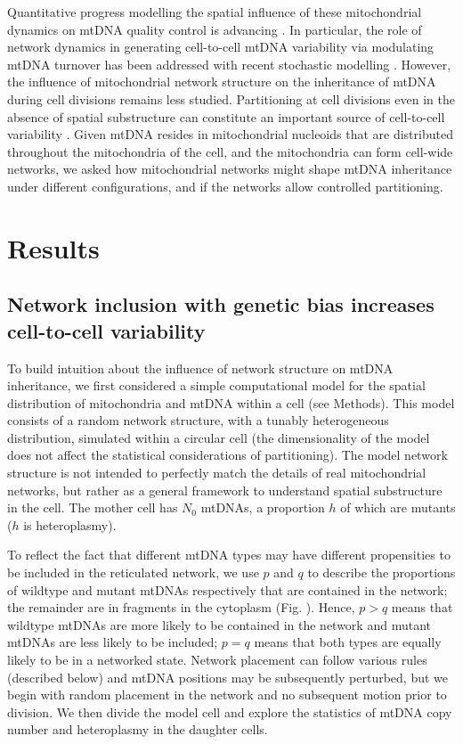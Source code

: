 \documentclass{article}
\begin{document}
Quantitative progress modelling the spatial influence of these mitochondrial dynamics on mtDNA quality control is advancing \citep{mouli2009frequency, tam2013mathematical, patel2013optimal, tam2015context,figge2012deceleration}. In particular, the role of network dynamics in generating cell-to-cell mtDNA variability via modulating mtDNA turnover has been addressed with recent stochastic modelling \cite{aryaman2019mitochondrial}. However, the influence of mitochondrial network structure on the inheritance of mtDNA during cell divisions remains less studied. Partitioning at cell divisions even in the absence of spatial substructure can constitute an important source of cell-to-cell variability \citep{huh2011non, johnston2015closed}. Given mtDNA resides in mitochondrial nucleoids \citep{ilamathi2021new} that are distributed throughout the mitochondria of the cell, and the mitochondria can form cell-wide networks, we asked how mitochondrial networks might shape mtDNA inheritance under different configurations, and if the networks allow controlled partitioning.

\section{Results}
\subsection{Network inclusion with genetic bias increases cell-to-cell variability}
To build intuition about the influence of network structure on mtDNA inheritance, we first considered a simple computational model for the spatial distribution of mitochondria and mtDNA within a cell (see Methods). This model consists of a random network structure, with a tunably heterogeneous distribution, simulated within a circular cell (the dimensionality of the model does not affect the statistical considerations of partitioning). The model network structure is not intended to perfectly match the details of real mitochondrial networks, but rather as a general framework to understand spatial substructure in the cell. The mother cell has $N_0$ mtDNAs, a proportion $h$ of which are mutants ($h$ is heteroplasmy). 

To reflect the fact that different mtDNA types may have different propensities to be included in the reticulated network, we use $p$ and $q$ to describe the proportions of wildtype and mutant mtDNAs respectively that are contained in the network; the remainder are in fragments in the cytoplasm (Fig. \label{fig:main_fig1_plotcell}). Hence, $p > q$ means that wildtype mtDNAs are more likely to be contained in the network and mutant mtDNAs are less likely to be included; $p=q$ means that both types are equally likely to be in a networked state. Network placement can follow various rules (described below) and mtDNA positions may be subsequently perturbed, but we begin with random placement in the network and no subsequent motion prior to division. We then divide the model cell and explore the statistics of mtDNA copy number and heteroplasmy in the daughter cells.
\end{document}
